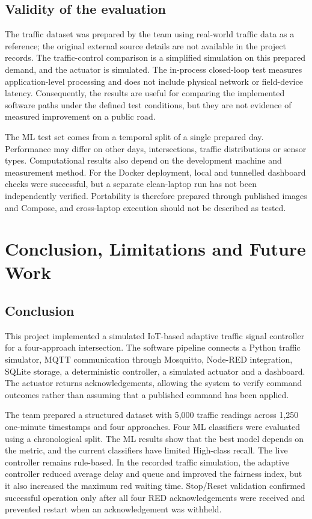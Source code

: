 \documentclass[12pt,a4paper,oneside]{report}
\begin{document}
\section{Validity of the evaluation}
The traffic dataset was prepared by the team using real-world traffic data as a reference; the original external source details are not available in the project records. The traffic-control comparison is a simplified simulation on this prepared demand, and the actuator is simulated. The in-process closed-loop test measures application-level processing and does not include physical network or field-device latency. Consequently, the results are useful for comparing the implemented software paths under the defined test conditions, but they are not evidence of measured improvement on a public road.

The ML test set comes from a temporal split of a single prepared day. Performance may differ on other days, intersections, traffic distributions or sensor types. Computational results also depend on the development machine and measurement method. For the Docker deployment, local and tunnelled dashboard checks were successful, but a separate clean-laptop run has not been independently verified. Portability is therefore prepared through published images and Compose, and cross-laptop execution should not be described as tested.

\clearpage
\chapter{Conclusion, Limitations and Future Work}
\section{Conclusion}
This project implemented a simulated IoT-based adaptive traffic signal controller for a four-approach intersection. The software pipeline connects a Python traffic simulator, MQTT communication through Mosquitto, Node-RED integration, SQLite storage, a deterministic controller, a simulated actuator and a dashboard. The actuator returns acknowledgements, allowing the system to verify command outcomes rather than assuming that a published command has been applied.

The team prepared a structured dataset with 5,000 traffic readings across 1,250 one-minute timestamps and four approaches. Four ML classifiers were evaluated using a chronological split. The ML results show that the best model depends on the metric, and the current classifiers have limited High-class recall. The live controller remains rule-based. In the recorded traffic simulation, the adaptive controller reduced average delay and queue and improved the fairness index, but it also increased the maximum red waiting time. Stop/Reset validation confirmed successful operation only after all four RED acknowledgements were received and prevented restart when an acknowledgement was withheld.
\end{document}
